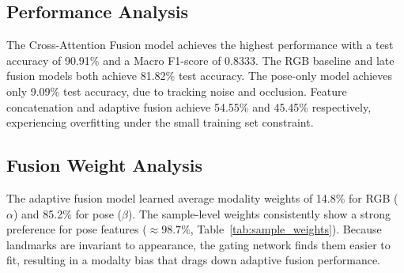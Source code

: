 \documentclass[conference]{IEEEtran}
\begin{document}
\begin{table}[t]
\centering
\caption{Performance Comparison of Evaluated Models}
\label{tab:results}
\end{table}

\subsection{Performance Analysis}

The Cross-Attention Fusion model achieves the highest performance with a test accuracy of 90.91\% and a Macro F1-score of 0.8333. The RGB baseline and late fusion models both achieve 81.82\% test accuracy. The pose-only model achieves only 9.09\% test accuracy, due to tracking noise and occlusion. Feature concatenation and adaptive fusion achieve 54.55\% and 45.45\% respectively, experiencing overfitting under the small training set constraint.

\subsection{Fusion Weight Analysis}

The adaptive fusion model learned average modality weights of 14.8\% for RGB ($\alpha$) and 85.2\% for pose ($\beta$). The sample-level weights consistently show a strong preference for pose features ($\approx 98.7\%$, Table~\ref{tab:sample_weights}). Because landmarks are invariant to appearance, the gating network finds them easier to fit, resulting in a modalty bias that drags down adaptive fusion performance.
\end{document}
